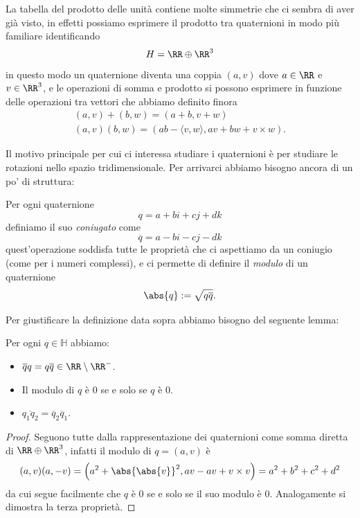 \documentclass[11pt]{scrartcl}
\begin{document}
   	 \begin{remark}
   	 	La tabella del prodotto delle unità contiene molte simmetrie che ci sembra di aver già visto, in effetti possiamo esprimere il prodotto tra quaternioni in modo più familiare identificando 
   	 	$$H=\RR\oplus \RR^3$$
   	 	in questo modo un quaternione diventa una coppia $(a,v)$ dove $a\in \RR$ e $v\in \RR^3$, e le operazioni di somma e prodotto si possono esprimere in funzione delle operazioni tra vettori che abbiamo definito finora
   	 	\begin{gather*} 
   	 		(a,v)+(b,w)=(a+b,v+w) \\
   	 		(a,v)(b,w)=\left(ab-\langle v,w\rangle,av+bw+v\times w\right).
   	 	\end{gather*}
   	 \end{remark}
   	 Il motivo principale per cui ci interessa studiare i quaternioni è per studiare le rotazioni nello spazio tridimensionale. Per arrivarci abbiamo bisogno ancora di un po' di struttura:
   	 \begin{definition}
   	 	Per ogni quaternione 
   	 	$$q=a+bi+cj+dk$$
   	 	definiamo il suo \textit{coniugato} come
   	 	$$\overline{q}=a-bi-cj-dk$$
   	 	quest'operazione soddisfa tutte le proprietà che ci aspettiamo da un coniugio (come per i numeri complessi), e ci permette di definire il \textit{modulo} di un quaternione
   	 	$$\abs{q}:=\sqrt{q\overline{q}}.$$
   	 \end{definition}
   	 Per giustificare la definizione data sopra abbiamo bisogno del seguente lemma:
   	 \begin{lemma}
   	 	Per ogni $q\in \mathbb{H}$ abbiamo:
   	 	\begin{itemize}
   	 		\item $\overline{q}q=q\overline{q}\in \RR\setminus\RR^-$.
   	 		\item Il modulo di $q$ è $0$ se e solo se $q$ è $0$.
   	 		\item $\overline{q_1q_2}=\overline{q}_2\overline{q}_1$.
   	 	\end{itemize}
   	 \end{lemma}
   	 \begin{proof}
   	 	Seguono tutte dalla rappresentazione dei quaternioni come somma diretta di $\RR\oplus\RR^3$, infatti il modulo di $q=(a,v)$ è
   	 	$$(a,v)(a,-v)=\left(a^2+\abs{\abs{v}}^2,av-av+v\times v\right)=a^2+b^2+c^2+d^2$$
   	 	da cui segue facilmente che $q$ è $0$ se e solo se il suo modulo è $0$. Analogamente si dimostra la terza proprietà.
   	 \end{proof}
\end{document}
